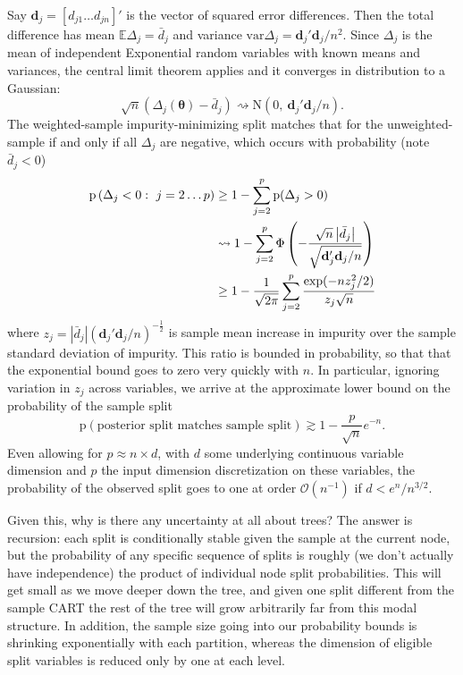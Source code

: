 \documentclass{article}
\begin{document}
Say $\mathbf{d}_j = [d_{j1}\ldots d_{jn}]'$ is the vector of squared
error differences. Then the total difference has mean
$\mathbb{E}\Delta_j  = \bar{d}_j$ and variance
$\mathrm{var}\Delta_j =  \mathbf{d}_j'\mathbf{d}_j/n^2$. Since
$\Delta_j$ is the mean of independent Exponential random variables with known
means and variances, the central limit theorem applies and it
converges in distribution to a Gaussian:
\begin{equation}
\sqrt{n}(\Delta_j(\boldsymbol{\theta}) -\bar{d}_j)\rightsquigarrow \mathrm{N}(0,~\mathbf{d}_j'\mathbf{d}_j/n ).
\end{equation}
The weighted-sample impurity-minimizing split matches that for the unweighted-sample if and only if all $\Delta_j$ are negative, which
occurs with probability (note $\bar d_j < 0$)
\begin{align}
\mathrm{p}\left(\Delta_j< 0 :~ j  = 2\dots p \right) 
& \geq 1 - \sum_{j=2}^p \mathrm{p}( \Delta_j > 0 ) \\
& \rightsquigarrow 1 
 - \sum_{j=2}^p \Phi\left( -\frac{\sqrt{n}\left|\bar{d}_j\right|}{\sqrt{\mathbf{d}_j'\mathbf{d}_j/n}}\right)\notag \\ 
& \geq 1 -  \frac{1}{\sqrt{2\pi}} \sum_{j=2}^p \frac{\exp(-n z^2_j/2)}{z_j\sqrt{n}} \notag
\end{align}
where
$z_j = \left|\bar{d}_j\right|\left(\mathbf{d}_j'\mathbf{d}_j/n\right)^{-\frac{1}{2}}$
is sample mean increase in impurity over the sample standard deviation
of impurity. This ratio is bounded in probability, so that that the
exponential bound goes to zero very quickly with $n$. In particular,
ignoring variation in $z_j$ across variables, we arrive at the approximate lower bound on the probability of the sample split
\[
\mathrm{p}\left(\text{posterior split matches sample split}\right) \gtrsim 1 - \frac{p}{\sqrt{n}} e^{-n}.
\]
Even allowing for $p \approx n\times d$, with
$d$ some underlying continuous variable dimension and $p$ the input
dimension discretization on these variables, the probability of the
observed split goes to one at order $\mathcal{O}(n^{-1})$ if
$d < e^{n}/n^{3/2}$.

Given this, why is there any uncertainty at all about trees? The answer
is recursion: each split is conditionally stable given the sample at the
current node, but the probability of any specific sequence of splits is
roughly (we don't actually have independence) the product of individual
node split probabilities. This will get small as we move deeper down the
tree, and given one split different from the sample CART the
rest of the tree will grow arbitrarily far from this modal structure.
In addition, the sample size going into our probability bounds is
shrinking exponentially with each partition, whereas the dimension of
eligible split variables is reduced only by one at each level.  
\end{document}
